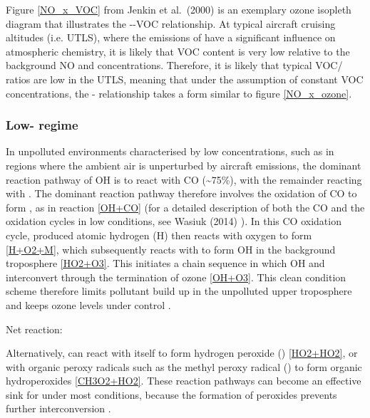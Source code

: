 Figure \ref{NO_x_VOC} from Jenkin et al.\ (2000) \cite{Jenkin2000} is an exemplary ozone isopleth diagram that illustrates the --VOC relationship. At typical aircraft cruising altitudes (i.e. UTLS), where the emissions of  have a significant influence on atmospheric chemistry, it is likely that VOC content is very low relative to the background NO and  concentrations. Therefore, it is likely that typical VOC/ ratios are low in the UTLS, meaning that under the assumption of constant VOC concentrations, the - relationship takes a form similar to figure \ref{NO_x_ozone}.

\subsubsection{Low- regime}
In unpolluted environments characterised by low  concentrations, such as in regions where the ambient air is unperturbed by aircraft emissions, the dominant reaction pathway of OH is to react with CO (\textasciitilde75\%), with the remainder reacting with  \cite{Thompson1992}. The dominant reaction pathway therefore involves the oxidation of CO to form , as in reaction \eqref{OH+CO} (for a detailed description of both the CO and the  oxidation cycles in low  conditions, see Wasiuk (2014) \cite{Wasiuk2014}). In this CO oxidation cycle, produced atomic hydrogen (H) then reacts with oxygen to form  \eqref{H+O2+M}, which subsequently reacts with  to form OH in the background troposphere \eqref{HO2+O3}. This initiates a chain sequence in which OH and  interconvert through the termination of ozone \eqref{OH+O3}. This clean condition scheme therefore limits pollutant build up in the unpolluted upper troposphere and keeps ozone levels under control \cite{Jacob1999}.





Net reaction: 

Alternatively,  can react with itself to form hydrogen peroxide () \eqref{HO2+HO2}, or with organic peroxy radicals such as the methyl peroxy radical () to form organic hydroperoxides \eqref{CH3O2+HO2}. These reaction pathways can become an effective sink for  under most conditions, because the formation of peroxides prevents further  interconversion \cite{Gunz1990}.

